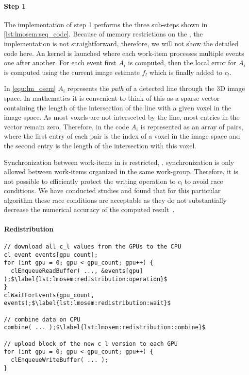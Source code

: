 \paragraph{Step 1}
The implementation of step 1 performs the three sub-steps shown in \autoref{lst:lmosem:seq_code}.
Because of memory restrictions on the \GPU, the \OpenCL implementation is not straightforward, therefore, we will not show the detailed code here.
An \OpenCL kernel is launched where each work-item processes multiple events one after another.
For each event first $A_i$ is computed, then the local error for $A_i$ is computed using the current image estimate $f_l$ which is finally added to $c_l$.

In \autoref{equ:lm_osem} $A_i$ represents the \emph{path} of a detected line through the 3D image space.
In mathematics it is convenient to think of this as a sparse vector containing the length of the intersection of the line with a given voxel in the image space.
As most voxels are not intersected by the line, most entries in the vector remain zero.
Therefore, in the \OpenCL code $A_i$ is represented as an array of pairs, where the first entry of each pair is the index of a voxel in the image space and the second entry is the length of the intersection with this voxel.

Synchronization between work-items in \OpenCL is restricted, \ie, synchronization is only allowed between work-items organized in the same work-group.
Therefore, it is not possible to efficiently protect the writing operation to $c_l$ to avoid race conditions.
We have conducted studies and found that for this particular algorithm these race conditions are acceptable as they do not substantially decrease the numerical accuracy of the computed result~\cite{SchellmannGoMeKoScWuBu2009}.


\paragraph{Redistribution}

\begin{lstlisting}[float,
  caption={OpenCL pseudocode for the redistribution phase},
  label={lst:lmosem:redistribution}]
// download all c_l values from the GPUs to the CPU
cl_event events[gpu_count];
for (int gpu = 0; gpu < gpu_count; gpu++) {
  clEnqueueReadBuffer( ..., &events[gpu] );$\label{lst:lmosem:redistribution:operation}$
}
clWaitForEvents(gpu_count, events);$\label{lst:lmosem:redistribution:wait}$

// combine data on CPU
combine( ... );$\label{lst:lmosem:redistribution:combine}$

// upload block of the new c_l version to each GPU
for (int gpu = 0; gpu < gpu_count; gpu++) {
  clEnqueueWriteBuffer( ... );
}
\end{lstlisting}

